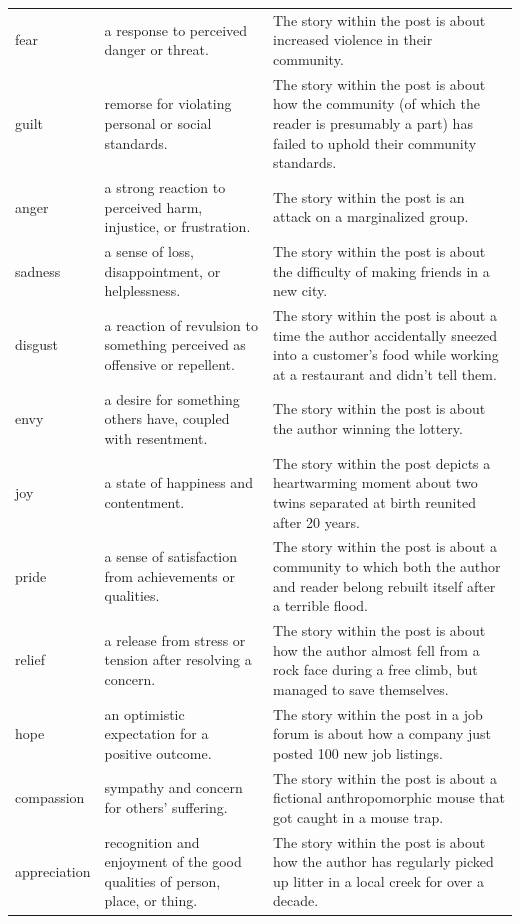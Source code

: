 \begin{longtable}[width=0.9\textwidth]{p{}p{}p{}}
{} \\
\midrule
fear & a response to perceived danger or threat. & The story within the post is about increased violence in their community. \\
guilt & remorse for violating personal or social standards. & The story within the post is about how the community (of which the reader is presumably a part) has failed to uphold their community standards. \\
anger & a strong reaction to perceived harm, injustice, or frustration. & The story within the post is an attack on a marginalized group. \\
sadness & a sense of loss, disappointment, or helplessness. & The story within the post is about the difficulty of making friends in a new city. \\
disgust & a reaction of revulsion to something perceived as offensive or repellent. & The story within the post is about a time the author accidentally sneezed into a customer's food while working at a restaurant and didn't tell them. \\
envy & a desire for something others have, coupled with resentment. & The story within the post is about the author winning the lottery. \\
joy & a state of happiness and contentment. & The story within the post depicts a heartwarming moment about two twins separated at birth reunited after 20 years. \\
pride & a sense of satisfaction from achievements or qualities. & The story within the post is about a community to which both the author and reader belong rebuilt itself after a terrible flood. \\
relief & a release from stress or tension after resolving a concern. & The story within the post is about how the author almost fell from a rock face during a free climb, but managed to save themselves. \\
hope & an optimistic expectation for a positive outcome. & The story within the post in a job forum is about how a company just posted 100 new job listings. \\
compassion & sympathy and concern for others' suffering. & The story within the post is about a fictional anthropomorphic mouse that got caught in a mouse trap. \\
appreciation & recognition and enjoyment of the good qualities of person, place, or thing. & The story within the post is about how the author has regularly picked up litter in a local creek for over a decade. \\

\end{longtable}

